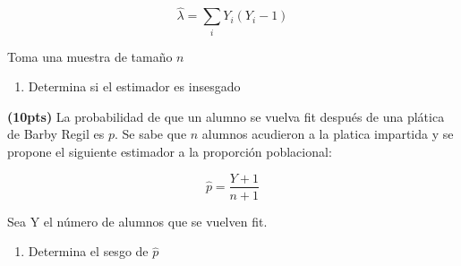 \documentclass[addpoints]{exam}
\theoremstyle{mytheor}
\begin{document}
\begin{questions}
$$\hat{\lambda} = \sum_i Y_i(Y_i-1) $$

Toma una muestra de tamaño $n$

\begin{enumerate}[label=\Alph*)]
\item Determina si el estimador es insesgado
\end{enumerate}


\question \textbf{(10pts)} La probabilidad de que un alumno se vuelva fit después de una plática de Barby Regil es $p$. Se sabe que $n$ alumnos acudieron a la platica impartida y se propone el siguiente estimador a la proporción poblacional:

$$\hat{p} = \frac{Y+1}{n+1}$$

Sea Y el número de alumnos que se vuelven fit. 

\begin{enumerate}[label=\Alph*)]
\item Determina el sesgo de $\hat{p}$
\end{enumerate}


  \end{questions}
  
\end{document}
